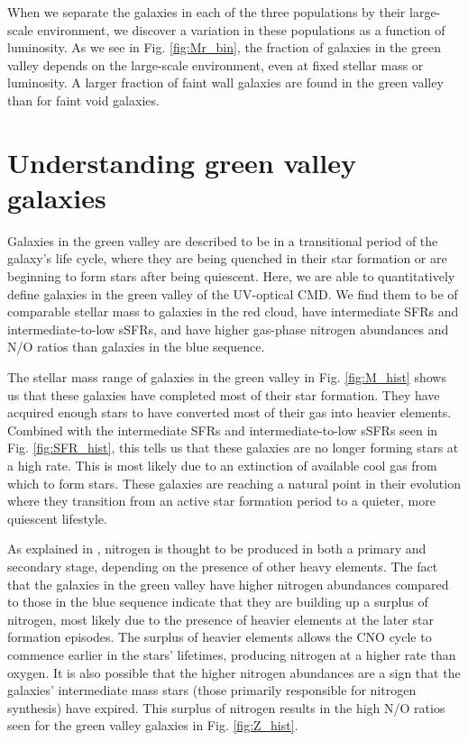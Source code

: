 When we separate the galaxies in each of the three populations by their 
large-scale environment, we discover a variation in these populations as a 
function of luminosity.  As we see in Fig. \ref{fig:Mr_bin}, the fraction of 
galaxies in the green valley depends on the large-scale environment, even at 
fixed stellar mass or luminosity.  A larger fraction of faint wall galaxies are 
found in the green valley than for faint void galaxies.




\section[Discussion]{Understanding green valley galaxies}

Galaxies in the green valley are described to be in a transitional period of the 
galaxy's life cycle, where they are being quenched in their star formation or 
are beginning to form stars after being quiescent.  Here, we are able to 
quantitatively define galaxies in the green valley of the UV-optical CMD.  We 
find them to be of comparable stellar mass to galaxies in the red cloud, have 
intermediate SFRs and intermediate-to-low sSFRs, and have higher gas-phase 
nitrogen abundances and N/O ratios than galaxies in the blue sequence.

The stellar mass range of galaxies in the green valley in Fig. \ref{fig:M_hist} 
shows us that these galaxies have completed most of their star formation.  They 
have acquired enough stars to have converted most of their gas into heavier 
elements.  Combined with the intermediate SFRs and intermediate-to-low sSFRs 
seen in Fig. \ref{fig:SFR_hist}, this tells us that these galaxies are no longer 
forming stars at a high rate.  This is most likely due to an extinction of 
available cool gas from which to form stars.  These galaxies are reaching a 
natural point in their evolution where they transition from an active star 
formation period to a quieter, more quiescent lifestyle.

As explained in \cite{Douglass17b}, nitrogen is thought to be produced in both a 
primary and secondary stage, depending on the presence of other heavy elements.  
The fact that the galaxies in the green valley have higher nitrogen abundances 
compared to those in the blue sequence indicate that they are building up a 
surplus of nitrogen, most likely due to the presence of heavier elements at the 
later star formation episodes.  The surplus of heavier elements allows the CNO 
cycle to commence earlier in the stars' lifetimes, producing nitrogen at a 
higher rate than oxygen.  It is also possible that the higher nitrogen 
abundances are a sign that the galaxies' intermediate mass stars (those 
primarily responsible for nitrogen synthesis) have expired.  This surplus of 
nitrogen results in the high N/O ratios seen for the green valley galaxies in 
Fig. \ref{fig:Z_hist}.

